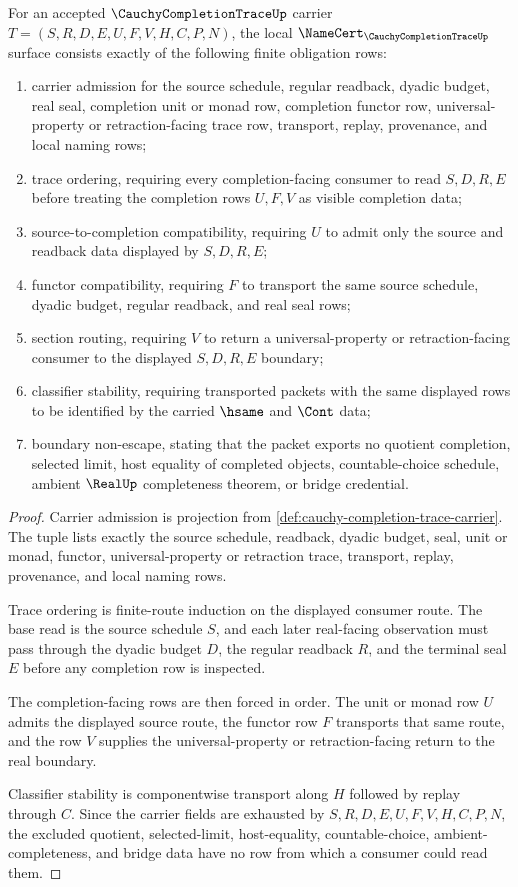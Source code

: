 \begin{theorem}
\label{thm:cauchy-completion-trace-namecert-obligations}
For an accepted $\CauchyCompletionTraceUp$ carrier $T=(S,R,D,E,U,F,V,H,C,P,N)$, the local $\NameCert_{\CauchyCompletionTraceUp}$ surface consists exactly of the following finite obligation rows:
\begin{enumerate}
\item carrier admission for the source schedule, regular readback, dyadic budget, real seal, completion unit or monad row, completion functor row, universal-property or retraction-facing trace row, transport, replay, provenance, and local naming rows;
\item trace ordering, requiring every completion-facing consumer to read $S,D,R,E$ before treating the completion rows $U,F,V$ as visible completion data;
\item source-to-completion compatibility, requiring $U$ to admit only the source and readback data displayed by $S,D,R,E$;
\item functor compatibility, requiring $F$ to transport the same source schedule, dyadic budget, regular readback, and real seal rows;
\item section routing, requiring $V$ to return a universal-property or retraction-facing consumer to the displayed $S,D,R,E$ boundary;
\item classifier stability, requiring transported packets with the same displayed rows to be identified by the carried $\hsame$ and $\Cont$ data;
\item boundary non-escape, stating that the packet exports no quotient completion, selected limit, host equality of completed objects, countable-choice schedule, ambient $\RealUp$ completeness theorem, or bridge credential.
\end{enumerate}
\end{theorem}
\begin{proof}
Carrier admission is projection from \autoref{def:cauchy-completion-trace-carrier}. The tuple lists exactly the source schedule, readback, dyadic budget, seal, unit or monad, functor, universal-property or retraction trace, transport, replay, provenance, and local naming rows.

Trace ordering is finite-route induction on the displayed consumer route. The base read is the source schedule $S$, and each later real-facing observation must pass through the dyadic budget $D$, the regular readback $R$, and the terminal seal $E$ before any completion row is inspected.

The completion-facing rows are then forced in order. The unit or monad row $U$ admits the displayed source route, the functor row $F$ transports that same route, and the row $V$ supplies the universal-property or retraction-facing return to the real boundary.

Classifier stability is componentwise transport along $H$ followed by replay through $C$. Since the carrier fields are exhausted by $S,R,D,E,U,F,V,H,C,P,N$, the excluded quotient, selected-limit, host-equality, countable-choice, ambient-completeness, and bridge data have no row from which a consumer could read them.
\end{proof}

